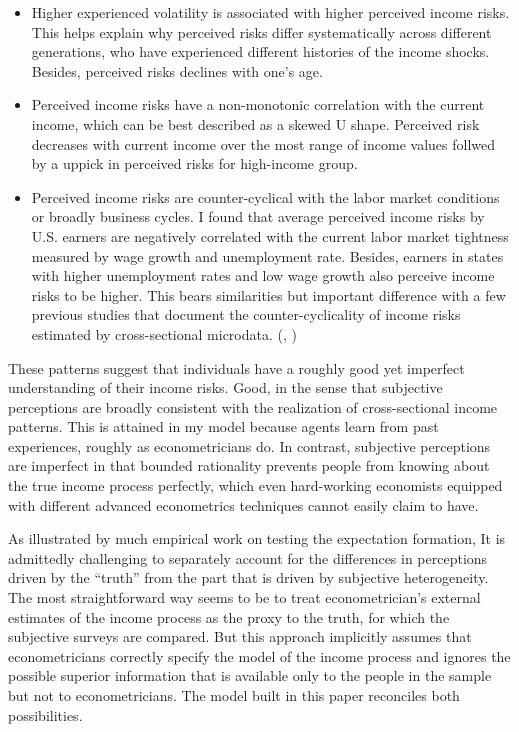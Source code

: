 \documentclass[12pt,notitlepage,onecolumn,aps,pra]{article}
\begin{document}
\begin{itemize}
\item
  Higher experienced volatility is associated with higher perceived
  income risks. This helps explain why perceived risks differ
  systematically across different generations, who have experienced
  different histories of the income shocks. Besides, perceived risks
  declines with one's age.
\item
  Perceived income risks have a non-monotonic correlation with the
  current income, which can be best described as a skewed U shape.
  Perceived risk decreases with current income over the most range of
  income values follwed by a uppick in perceived risks for high-income
  group.
\item
  Perceived income risks are counter-cyclical with the labor market
  conditions or broadly business cycles. I found that average perceived
  income risks by U.S. earners are negatively correlated with the
  current labor market tightness measured by wage growth and
  unemployment rate. Besides, earners in states with higher unemployment
  rates and low wage growth also perceive income risks to be higher.
  This bears similarities but important difference with a few previous
  studies that document the counter-cyclicality of income risks
  estimated by cross-sectional microdata. (\cite{guvenen2014nature},
  \cite{catherine_countercyclical_2019})
\end{itemize}

These patterns suggest that individuals have a roughly good yet
imperfect understanding of their income risks. Good, in the sense that
subjective perceptions are broadly consistent with the realization of
cross-sectional income patterns. This is attained in my model because
agents learn from past experiences, roughly as econometricians do. In
contrast, subjective perceptions are imperfect in that bounded
rationality prevents people from knowing about the true income process
perfectly, which even hard-working economists equipped with different
advanced econometrics techniques cannot easily claim to have.

As illustrated by much empirical work on testing the expectation
formation, It is admittedly challenging to separately account for the
differences in perceptions driven by the ``truth'' from the part that is
driven by subjective heterogeneity. The most straightforward way seems
to be to treat econometrician's external estimates of the income process
as the proxy to the truth, for which the subjective surveys are
compared. But this approach implicitly assumes that econometricians
correctly specify the model of the income process and ignores the
possible superior information that is available only to the people in
the sample but not to econometricians. The model built in this paper
reconciles both possibilities.
\end{document}

